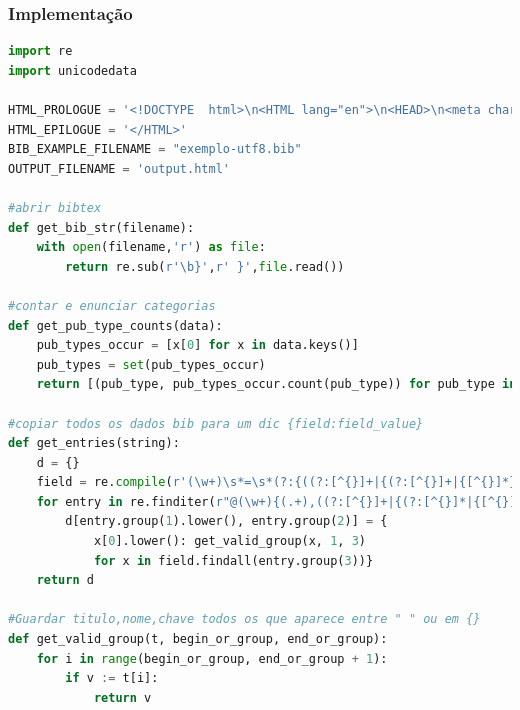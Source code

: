 \documentclass[11pt,a4paper]{report}
\begin{document}
\subsubsection{Implementação}
\begin{lstlisting}[language=python]
import re
import unicodedata

HTML_PROLOGUE = '<!DOCTYPE  html>\n<HTML lang="en">\n<HEAD>\n<meta charset="utf-8">\n      <TITLE>Categories in BibTeX</TITLE>\n <script type="text/x-mathjax-config"> MathJax.Hub.Config({"extensions":["tex2jax.js"],"jax":["input/TeX","output/HTML-CSS"],"messageStyle":"none","tex2jax":{"processEnvironments":false,"processEscapes":true,"inlineMath":[["$","$"],["\\(","\\)"]],"displayMath":[["$$","$$"],["\\[","\\]"]]},"TeX":{"extensions":["AMSmath.js","AMSsymbols.js","noErrors.js","noUndefined.js"]},"HTML-CSS":{"availableFonts":["TeX"]}}); </script> <script type="text/javascript" async src="file:////home/useralef/.vscode/extensions/shd101wyy.markdown-preview-enhanced-0.6.1/node_modules/@shd101wyy/mume/dependencies/mathjax/MathJax.js" charset="UTF-8"></script>  </HEAD>\n'
HTML_EPILOGUE = '</HTML>'
BIB_EXAMPLE_FILENAME = "exemplo-utf8.bib"
OUTPUT_FILENAME = 'output.html'

#abrir bibtex
def get_bib_str(filename):
    with open(filename,'r') as file:
        return re.sub(r'\b}',r' }',file.read())

#contar e enunciar categorias
def get_pub_type_counts(data):
    pub_types_occur = [x[0] for x in data.keys()]
    pub_types = set(pub_types_occur)
    return [(pub_type, pub_types_occur.count(pub_type)) for pub_type in pub_types]

#copiar todos os dados bib para um dic {field:field_value}
def get_entries(string):
    d = {}
    field = re.compile(r'(\w+)\s*=\s*(?:{((?:[^{}]+|{(?:[^{}]+|{[^{}]*})+})+)}|"([^"]+)"|(\d+))')
    for entry in re.finditer(r"@(\w+){(.+),((?:[^{}]+|{(?:[^{}]*|{[^{}]*})+})+)", string):
        d[entry.group(1).lower(), entry.group(2)] = {
            x[0].lower(): get_valid_group(x, 1, 3)
            for x in field.findall(entry.group(3))}
    return d

#Guardar titulo,nome,chave todos os que aparece entre " " ou em {}
def get_valid_group(t, begin_or_group, end_or_group):
    for i in range(begin_or_group, end_or_group + 1):
        if v := t[i]:
            return v


\end{lstlisting}
\end{document}
